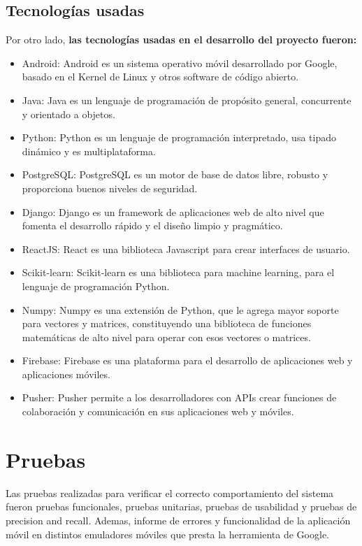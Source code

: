 \documentclass[12pt,letterpaper,openany]{book}
\begin{document}
\subsection{Tecnologías usadas}
Por otro lado, \textbf{las tecnologías usadas en el desarrollo del proyecto fueron:}
\begin{itemize}
    \item Android: Android \cite{29} es un sistema operativo móvil desarrollado por Google, basado en el Kernel de Linux y otros software de código abierto.
    \item Java: Java \cite{30} es un lenguaje de programación de propósito general, concurrente y orientado a objetos.
    \item Python: Python \cite{31} es un lenguaje de programación interpretado, usa tipado dinámico y es multiplataforma.
    \item PostgreSQL: PostgreSQL \cite{32} es un motor de base de datos libre, robusto y proporciona buenos niveles de seguridad.
    \item Django: Django \cite{33} es un framework de aplicaciones web de alto nivel que fomenta el desarrollo rápido y el diseño limpio y pragmático.
    \item ReactJS: React \cite{34} es una biblioteca Javascript para crear interfaces de usuario.
    \item Scikit-learn: Scikit-learn \cite{35} es una biblioteca para machine learning, para el lenguaje de programación Python.
    \item Numpy: Numpy \cite{36} es una extensión de Python, que le agrega mayor soporte para vectores y matrices, constituyendo una biblioteca de funciones matemáticas de alto nivel para operar con esos vectores o matrices.
    \item Firebase: Firebase \cite{37} es una plataforma para el desarrollo de aplicaciones web y aplicaciones móviles.
    \item Pusher: Pusher \cite{38} permite a los desarrolladores con APIs crear funciones de colaboración y comunicación en sus aplicaciones web y móviles.
\end{itemize}

\section{Pruebas}
Las pruebas realizadas para verificar el correcto comportamiento del sistema fueron pruebas funcionales, pruebas unitarias, pruebas de usabilidad y pruebas de precision and recall. Ademas, informe de errores y funcionalidad de la aplicación móvil en distintos emuladores móviles que presta la herramienta de Google.
\end{document}

